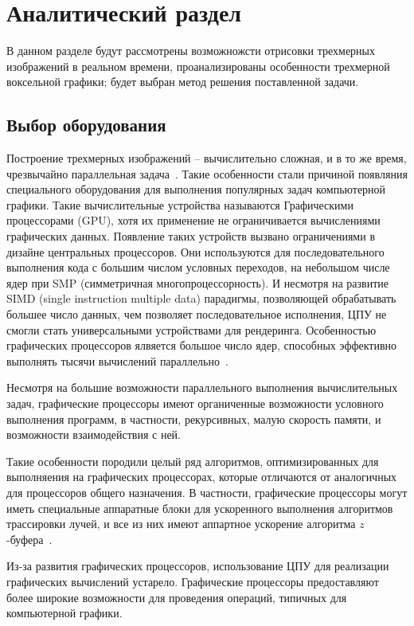 \chapter{Аналитический раздел}

В данном разделе будут рассмотрены возможножсти отрисовки 
трехмерных изображений в реальном времени, проанализированы особенности трехмерной 
воксельной графики; будет выбран метод решения поставленной задачи.

\section{Выбор оборудования}

Построение трехмерных изображений -- вычислительно сложная, и в то же время, чрезвычайно 
параллельная задача~\cite{DaBPP}. Такие особенности стали причиной появляния специального оборудования 
для выполнения популярных задач компьютерной графики. Такие вычислительные устройства
называются Графическими процессорами (GPU), хотя их применение не ограничивается вычислениями
графических данных. Появление таких устройств вызвано ограничениями в дизайне центральных
процессоров. Они используются для последовательного выполнения кода с большим числом условных 
переходов, на небольшом числе ядер при SMP (симметричная многопроцессорность). И несмотря на 
развитие SIMD (single instruction multiple data) парадигмы, позволяющей обрабатывать большее число данных, чем позволяет
последовательное исполнения, ЦПУ не смогли стать универсальными устройствами для рендеринга.
Особенностью графических процессоров ялвяется большое число ядер, способных эффективно 
выполнять тысячи вычислений параллельно~\cite{ACLaG}.

Несмотря на большие возможности параллельного выполнения вычислительных задач,
графические процессоры имеют органиченные возможности условного выполнения программ, в 
частности, рекурсивных, малую скорость памяти, и возможности взаимодействия с ней.

Такие особенности породили целый ряд алгоритмов, оптимизированных для выполняения 
на графических
процессорах, которые отличаются от аналогичных для процессоров общего назначения. 
В частности, 
графические процессоры могут иметь специальные аппаратные блоки для ускоренного выполнения 
алгоритмов трассировки лучей, и все из них имеют аппартное ускорение алгоритма $z$-буфера~\cite{RTiv}.

Из-за развития графических процессоров, использование ЦПУ для реализации графических
вычислений устарело. Графические процессоры предоставляют более широкие возможности 
для проведения операций, типичных для компьютерной графики. 

